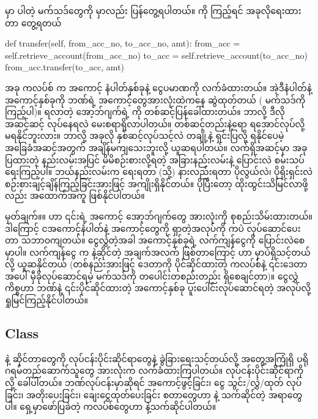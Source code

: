  မှာ ပါတဲ့ မက်သဒ်တွေကို  မှာလည်း ပြန်တွေ့ရပါတယ်။  ကို ကြည့်ရင် အခုလိုရေးထားတာ တွေ့ရတယ်
%
\begin{py}
def transfer(self, from_acc_no, to_acc_no, amt):
    from_acc = self.retrieve_account(from_acc_no)
    to_acc = self.retrieve_account(to_acc_no)
    from_acc.transfer(to_acc, amt)
\end{py}
%
အခု  ကလပ်စ်  က အကောင့် နံပါတ်နှစ်ခုနဲ့ ငွေပမာဏကို လက်ခံထားတယ်။ အဲ့ဒီနံပါတ်နဲ့ အကောင့်နှစ်ခုကို ဘဏ်ရဲ့ အကောင့်တွေအားလုံးထဲကနေ ဆွဲထုတ်တယ် ( မက်သဒ်ကို ကြည့်ပါ)။ ရလာတဲ့ အော့ဘ်ဂျက်ရဲ့  ကို တစ်ဆင့်ပြန်ခေါ်ထားတယ်။ ဘာလို့ ဒီလို အဆင့်ဆင့် လုပ်နေရလဲ မေးစရာရှိလာပါတယ်။ တစ်ဆင့်တည်းနဲ့ရော ရအောင်လုပ်လို့ မရနိုင်ဘူးလား။ ဘာလို့ အခုလို နှစ်ဆင့်လုပ်သင့်လဲ  တချို့နဲ့ ရှင်းပြလို့ ရနိုင်ပေမဲ့ အခြေခံအဆင့်အတွက် အချိန်မကျသေးဘူးလို့ ယူဆရပါတယ်။ လက်ရှိအဆင့်မှာ အခုပြထားတဲ့ နည်းလမ်းအပြင် မိမိစဉ်းစားလို့ရတဲ့ အခြားနည်းလမ်းနဲ့ ပြောင်းလဲ စမ်းသပ်ရေးကြည့်ပါ။ ဘယ်နည်းလမ်းက ရေးရတာ (သို့) နားလည်းရတာ ပိုလွယ်လဲ၊ ပိုရိုးရှင်းလဲ စဉ်းစားချင့်ချိန်ကြည့်ခြင်းအားဖြင့် အကျိုးရှိနိုင်တယ်။ ပိုပြီးတော့ ထိုးထွင်းသိမြင်လာဖို့လည်း အထောက်အကူ ဖြစ်နိုင်ပါတယ်။

မှတ်ချက်။\qquad ။  ဟာ ၎င်းရဲ့ အကောင့် အော့ဘ်ဂျက်တွေ အားလုံးကို စုစည်းသိမ်းထားတယ်။ ဒါကြောင့် ငအကောင့်နံပါတ်နဲ့ အကောင့်တွေကို ရှာတဲ့အလုပ်ကို  ကပဲ လုပ်ဆောင်ပေးတာ သဘာဝ\allowbreak ကျတယ်။ ငွေလွှဲတဲ့အခါ အကောင့်နှစ်ခုရဲ့ လက်ကျန်ငွေကို ပြောင်းလဲစေမှာပါ။ လက်ကျန်ငွေ  က  နဲ့ဆိုင်တဲ့ အချက်အလက် ဖြစ်တာကြောင့်  ဟာ  မှာပဲရှိသင့်တယ်လို့ ယူဆနိုင်တယ် (တစ်နည်းအားဖြင့် ဒေတာကို ပိုင်ဆိုင်ထားတဲ့ ကလပ်စ်နဲ့ ၎င်းဒေတာအပေါ် မှီခိုလုပ်ဆောင်ရမဲ့ မက်သဒ်ကို တပေါင်းတစည်းတည်း ရှိစေချင်တာ)။  ငွေလွှဲကိစ္စဟာ ဘဏ်နဲ့ ၎င်းပိုင်ဆိုင်ထားတဲ့ အကောင့်နှစ်ခု ပူးပေါင်းလုပ်ဆောင်ရတဲ့ အလုပ်လို့ ရှုမြင်ကြည့်နိုင်ပါတယ်။

\subsection*{ Class}

 နဲ့ ဆိုင်တာတွေကို လုပ်ငန်းပိုင်းဆိုင်ရာတွေနဲ့ ခွဲခြားရေးသင့်တယ်လို့ အတွေ့အကြုံရှိ ပရိုဂရမ်တည်ဆောက်သူတွေ အားလုံးက လက်ခံထားကြပါတယ်။ လုပ်ငန်းပိုင်းဆိုင်ရာကို  လို့ ခေါ်ပါတယ်။ ဘဏ်လုပ်ငန်းမှာဆိုရင် အကောင့်ဖွင့်ခြင်း၊ ငွေ သွင်း/လွှဲ/ထုတ် လုပ်ခြင်း၊ အတိုးပေးခြင်း၊ ချေးငွေထုတ်ပေးခြင်း စတာတွေဟာ  နဲ့ သက်ဆိုင်တဲ့ အရာတွေပါ။ ရှေ့မှာဖော်ပြခဲတဲ့ ကလပ်စ်တွေဟာ  နဲ့သက်ဆိုင်ပါတယ်။ 

